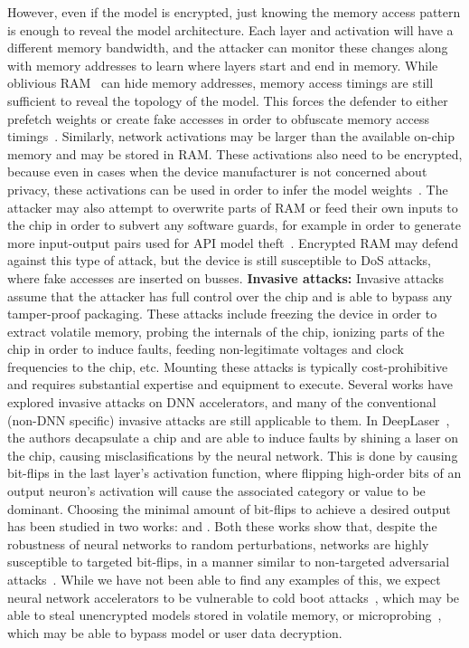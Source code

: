 However, even if the model is encrypted, just knowing the memory access pattern is enough to reveal the model architecture. Each layer and activation will have a different memory bandwidth, and the attacker can monitor these changes along with memory addresses to learn where layers start and end in memory. While oblivious RAM~ can hide memory addresses, memory access timings are still sufficient to reveal the topology of the model. This forces the defender to either prefetch weights or create fake accesses in order to obfuscate memory access timings~.
Similarly, network activations may be larger than the available on-chip memory and may be stored in RAM. These activations also need to be encrypted, because even in cases when the device manufacturer is not concerned about privacy, these activations can be used in order to infer the model weights~. 
The attacker may also attempt to overwrite parts of RAM or feed their own inputs to the chip in order to subvert any software guards, for example in order to generate more input-output pairs used for API model theft~. Encrypted RAM may defend against this type of attack, but the device is still susceptible to DoS attacks, where fake accesses are inserted on busses. 
\noindent \textbf{Invasive attacks:}
Invasive attacks assume that the attacker has full control over the chip and is able to bypass any tamper-proof packaging.
These attacks include freezing the device in order to extract volatile memory, probing the internals of the chip, ionizing parts of the chip in order to induce faults, feeding non-legitimate voltages and clock frequencies to the chip, etc. Mounting these attacks is typically cost-prohibitive and requires substantial expertise and equipment to execute. 
Several works have explored invasive attacks on DNN accelerators, and many of the conventional (non-DNN specific) invasive attacks are still applicable to them. In DeepLaser~, the authors decapsulate a chip and are able to induce faults by shining a laser on the chip, causing misclasifications by the neural network. This is done by causing bit-flips in the last layer's activation function, where flipping high-order bits of an output neuron's activation will cause the associated category or value to be dominant. Choosing the minimal amount of bit-flips to achieve a desired output has been studied in two works:  and . Both these works show that, despite the robustness of neural networks to random perturbations, networks are highly susceptible to targeted bit-flips, in a manner similar to non-targeted adversarial attacks~.
While we have not been able to find any examples of this, we expect neural network accelerators to be vulnerable to cold boot attacks~, which may be able to steal unencrypted models stored in volatile memory, or microprobing~, which may be able to bypass model or user data decryption.


